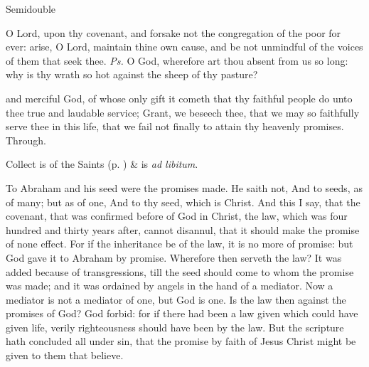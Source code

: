 \begin{inhead}
{Semidouble}
\end{inhead}

\properantiphonfix

\introit
{} O Lord, upon thy covenant, and forsake not the congregation of the poor for ever: arise, O Lord, maintain thine own cause, and be not unmindful of the voices of them that seek thee. \textit{Ps.} O God, wherefore art thou absent from us so long: why is thy wrath so hot against the sheep of thy pasture?

\collect
{} and merciful God, of whose only gift it cometh that thy faithful people do unto thee true and laudable service; Grant, we beseech thee, that we may so faithfully serve thee in this life, that we fail not finally to attain thy heavenly promises. Through.
\begin{rubric}
     Collect is of the Saints (p. \pageref{SPSaints}) \&  is \emph{ad libitum}.
\end{rubric}

 To Abraham and his seed were the promises made. He saith not, And to seeds, as of many; but as of one, And to thy seed, which is Christ. And this I say, that the covenant, that was confirmed before of God in Christ, the law, which was four hundred and thirty years after, cannot disannul, that it should make the promise of none effect. For if the inheritance be of the law, it is no more of promise: but God gave it to Abraham by promise. Wherefore then serveth the law? It was added because of transgressions, till the seed should come to whom the promise was made; and it was ordained by angels in the hand of a mediator. Now a mediator is not a mediator of one, but God is one. Is the law then against the promises of God? God forbid: for if there had been a law given which could have given life, verily righteousness should have been by the law. But the scripture hath concluded all under sin, that the promise by faith of Jesus Christ might be given to them that believe.


